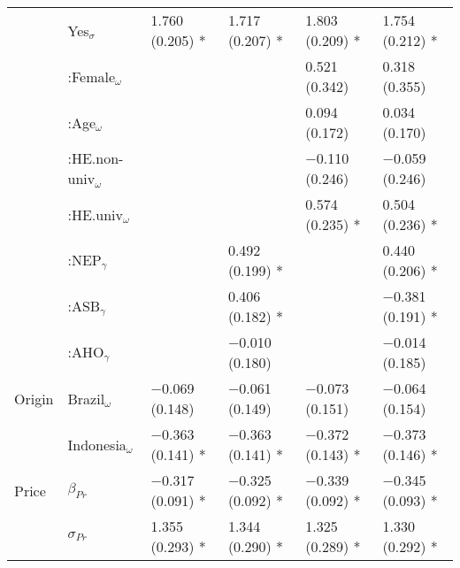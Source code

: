 \documentclass[sustainability,article,accept,moreauthors,pdftex,10pt,a4paper]{Definitions/mdpi}
\theoremstyle{mdpi}
\theoremstyle{mdpidefinition}
\begin{document}
{{\begin{table}[H]
{\begin{tabular}{p{2cm}p{2.5cm}p{2.5cm}p{2.5cm}p{2.5cm} p{2.5cm}}
& Yes$_\sigma$ &                 1.760 (0.205) *               & 1.717 (0.207) *                    & 1.803 (0.209) *                        & 1.754 (0.212) *\\
& :Female$_\omega$  &                                         &                                  & 0.521 (0.342)                         & 0.318 (0.355)  \\
& :Age$_\omega$  &                                            &                                 & 0.094 (0.172)                         & 0.034 (0.170) \\
& :HE.non-univ$_\omega$  &                                    &                                 & $-$0.110 (0.246)                        & $-$0.059 (0.246) \\
& :HE.univ$_\omega$  &                                        &                                  & 0.574 (0.235) *                        & 0.504 (0.236) *\\
& :NEP$_\gamma$ &                                             & 0.492 (0.199) *                     &                                      &  0.440 (0.206) * \\
& :ASB$_\gamma$  &                                            & 0.406 (0.182) *                  &                                      &  $-$0.381 (0.191) * \\
& :AHO$_\gamma$ &                                             & $-$0.010 (0.180)                    &                                      &  $-$0.014 (0.185) \\
\midrule
Origin & Brazil$_\omega$ &                       $-$0.069 (0.148)               & $-$0.061 (0.149)                    & $-$0.073 (0.151)                        &  $-$0.064 (0.154)  \\
& Indonesia$_\omega$ &                    $-$0.363 (0.141) *              & $-$0.363 (0.141) *                   & $-$0.372 (0.143) *                       &   $-$0.373 (0.146) * \\
\midrule
Price  & $\beta_{Pr}$  &                     $-$0.317 (0.091) *              & $-$0.325 (0.092) *                  & $-$0.339 (0.092) *                       & $-$0.345 (0.093) * \\
& $\sigma_{Pr}$  &                    1.355 (0.293) *               & 1.344 (0.290) *                     & 1.325 (0.289) *                        & 1.330 (0.292) * \\

\end{tabular}}
\end{table}}}
\end{document}

